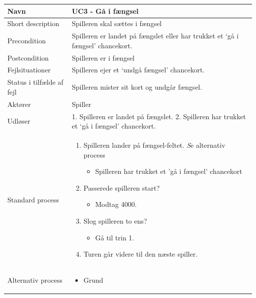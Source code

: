 \begin{center}
\begin{longtable}{|l|p{11cm}|}
\hline
Navn &  UC3 - Gå i fængsel\\
\hline
Short description & Spilleren skal sættes i fængsel \\
\hline
Precondition & Spilleren er landet på fængslet eller har trukket et ‘gå i fængsel’ chancekort. \\
\hline
Postcondition & Spilleren er i fængsel \\
\hline
Fejlsituationer & Spilleren ejer et ‘undgå fængsel’ chancekort. \\
\hline
Status i tilfælde af fejl & Spilleren mister sit kort og undgår fængsel. \\
\hline
Aktører & Spiller \\
\hline
Udløser & 1. Spilleren er landet på fængslet.
2. Spilleren har trukket et ‘gå i fængsel’ chancekort.
 \\
\hline
Standard process &  
\begin{minipage}[t]{1\textwidth}
  \begin{enumerate}
      \item Spilleren lander på fængsel-feltet.\newline
      \emph Se alternativ process\
      \begin{itemize}
          \item Spilleren har trukket et 'gå i fængsel' chancekort
      \end{itemize}
      \item Passerede spilleren start?
      \begin{itemize}
          \item Modtag 4000. 
      \end{itemize}
      \item Slog spilleren to ens?
      \begin{itemize}
          \item Gå til trin 1.
      \end{itemize}
      \item Turen går videre til den næste spiller.\vspace{0.5cm}
  \end{enumerate} 
  \end{minipage}
\\
\hline
Alternativ process & 
\begin{minipage}[t]{1\textwidth}
 \begin{itemize}
     \item Grund

\end{itemize}
\end{minipage}
\end{longtable}
\end{center}
